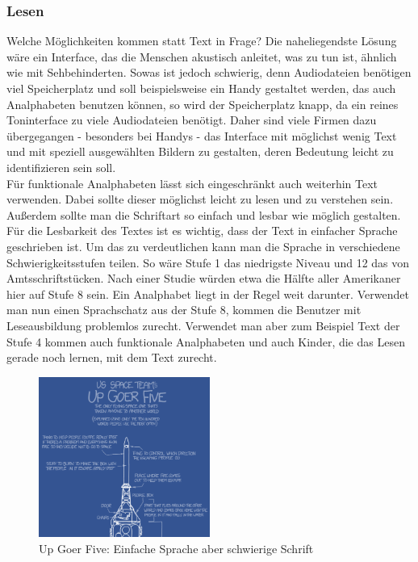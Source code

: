 \subsubsection{Lesen}
Welche Möglichkeiten kommen statt Text in Frage? Die naheliegendste Lösung wäre ein Interface, das die Menschen akustisch anleitet, was zu tun ist, ähnlich wie mit Sehbehinderten. Sowas ist jedoch schwierig, denn Audiodateien benötigen viel Speicherplatz und soll beispielsweise ein Handy gestaltet werden, das auch Analphabeten benutzen können, so wird der Speicherplatz knapp, da ein reines Toninterface zu viele Audiodateien benötigt. Daher sind viele Firmen dazu übergegangen - besonders bei Handys - das Interface mit möglichst wenig Text und mit speziell ausgewählten Bildern zu gestalten, deren Bedeutung leicht zu identifizieren sein soll.\\
Für funktionale Analphabeten lässt sich eingeschränkt auch weiterhin Text verwenden. Dabei sollte dieser möglichst leicht zu lesen und zu verstehen sein. Außerdem sollte man die Schriftart so einfach und lesbar wie möglich gestalten.\\
Für die Lesbarkeit des Textes ist es wichtig, dass der Text in einfacher Sprache geschrieben ist. Um das zu verdeutlichen kann man die Sprache in verschiedene Schwierigkeitsstufen teilen.
So wäre Stufe 1 das niedrigste Niveau und  12 das von Amtsschriftstücken. Nach einer Studie würden etwa die Hälfte aller Amerikaner hier auf Stufe 8 sein. Ein Analphabet liegt in der Regel weit darunter. Verwendet man nun einen Sprachschatz aus der Stufe 8, kommen die Benutzer mit Leseausbildung problemlos zurecht. Verwendet man aber zum Beispiel Text der Stufe 4 kommen auch funktionale Analphabeten und auch Kinder, die das Lesen gerade noch lernen, mit dem Text zurecht.

\begin{figure}[h]
	\centering
		\includegraphics[width=0.50\textwidth]{Daten/up_goer_five_part.png}
	\caption{Up Goer Five: Einfache Sprache aber schwierige Schrift}
	\label{fig:GiveFive}
\end{figure}

